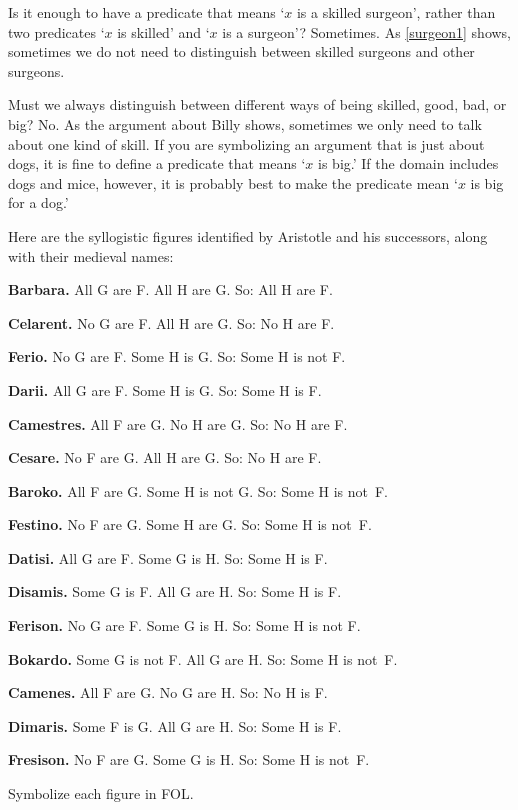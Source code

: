 Is it enough to have a predicate that means `$x$ is a skilled surgeon', rather than two predicates `$x$ is skilled' and `$x$ is a surgeon'? Sometimes. As \cref{surgeon1} shows, sometimes we do not need to distinguish between skilled surgeons and other surgeons.

Must we always distinguish between different ways of being skilled, good, bad, or big? No. As the argument about Billy shows, sometimes we only need to talk about one kind of skill. If you are symbolizing an argument that is just about dogs, it is fine to define a predicate that means `$x$ is big.' If the domain includes dogs and mice, however, it is probably best to make the predicate mean `$x$ is big for a dog.'

\practiceproblems
\problempart
\label{pr.BarbaraEtc}
Here are the syllogistic figures identified by Aristotle and his successors, along with their medieval names:
\begin{compactlist}
	\item \textbf{Barbara.} All G are F. All H are G. So:  All H are F.
	\item \textbf{Celarent.} No G are F. All H are G. So: No H are F.
	\item \textbf{Ferio.} No G are F. Some H is G. So: Some H is not F.
	\item \textbf{Darii.} All G are F. Some H is G. So: Some H is F.
	\item \textbf{Camestres.} All F are G. No H are G. So: No H are F.
	\item \textbf{Cesare.} No F are G. All H are G. So: No H are F.
	\item \textbf{Baroko.} All F are G. Some H is not G. So: Some H is not~F.
	\item \textbf{Festino.} No F are G. Some H are G. So: Some H is not~F.
	\item \textbf{Datisi.} All G are F. Some G is H. So: Some H is F.
	\item \textbf{Disamis.} Some G is F. All G are H. So: Some H is F.
	\item \textbf{Ferison.} No G are F. Some G is H. So: Some H is not F.
	\item \textbf{Bokardo.} Some G is not F. All G are H. So:  Some H is not~F.
	\item \textbf{Camenes.} All F are G. No G are H. So: No H is F.
	\item \textbf{Dimaris.} Some F is G. All G are H. So: Some H is F.
	\item \textbf{Fresison.} No F are G. Some G is H. So: Some H is not~F.
\end{compactlist}
Symbolize each figure in FOL.

